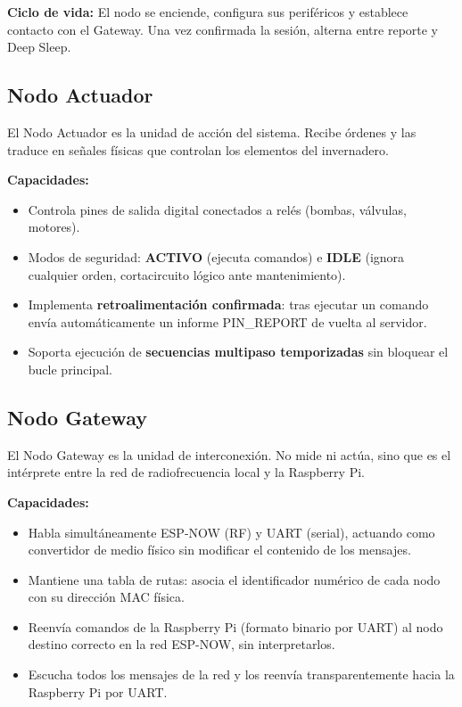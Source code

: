 \textbf{Ciclo de vida:} El nodo se enciende, configura sus periféricos y establece contacto
con el Gateway. Una vez confirmada la sesión, alterna entre reporte y Deep Sleep.


\subsection{Nodo Actuador}

El Nodo Actuador es la unidad de acción del sistema. Recibe órdenes y las traduce en señales
físicas que controlan los elementos del invernadero.

\textbf{Capacidades:}
\begin{itemize}[leftmargin=*, label=--]
    \item Controla pines de salida digital conectados a relés (bombas, válvulas, motores).
    \item Modos de seguridad: \textbf{ACTIVO} (ejecuta comandos) e \textbf{IDLE}
          (ignora cualquier orden, cortacircuito lógico ante mantenimiento).
    \item Implementa \textbf{retroalimentación confirmada}: tras ejecutar un comando envía
          automáticamente un informe PIN\_REPORT de vuelta al servidor.
    \item Soporta ejecución de \textbf{secuencias multipaso temporizadas} sin bloquear
          el bucle principal.
\end{itemize}


\subsection{Nodo Gateway}

El Nodo Gateway es la unidad de interconexión. No mide ni actúa, sino que es el intérprete entre
la red de radiofrecuencia local y la Raspberry Pi.

\textbf{Capacidades:}
\begin{itemize}[leftmargin=*, label=--]
    \item Habla simultáneamente ESP-NOW (RF) y UART (serial), actuando como convertidor
          de medio físico sin modificar el contenido de los mensajes.
    \item Mantiene una tabla de rutas: asocia el identificador numérico de cada nodo
          con su dirección MAC física.
    \item Reenvía comandos de la Raspberry Pi (formato binario por UART) al nodo destino
          correcto en la red ESP-NOW, sin interpretarlos.
    \item Escucha todos los mensajes de la red y los reenvía transparentemente hacia la
          Raspberry Pi por UART.
\end{itemize}


